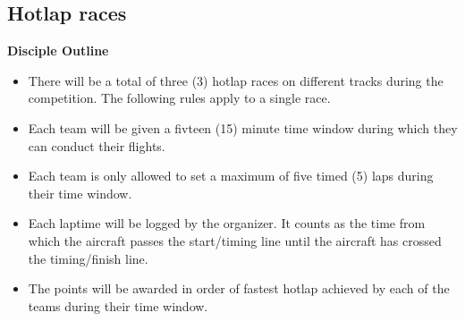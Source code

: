     \subsection{Hotlap races}
    \textbf{Disciple Outline}
    \begin{itemize}
      \item There will be a total of three (3) hotlap races on different tracks during the competition. The following rules apply to a single race.
      \item Each team will be given a fivteen (15) minute time window during which they can conduct their flights. 
      \item Each team is only allowed to set a maximum of five timed (5) laps during their time window. 
      \item Each laptime will be logged by the organizer. It counts as the time from which the aircraft passes the start/timing line until the aircraft has crossed the timing/finish line. 
      \item The points will be awarded in order of fastest hotlap achieved by each of the teams during their time window.
    \end{itemize}

